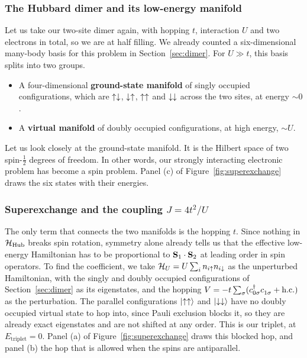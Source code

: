 \documentclass[lecture_notes.tex]{subfiles}
\begin{document}
\subsubsection{The Hubbard dimer and its low-energy manifold}
Let us take our two-site dimer again, with hopping $t$, interaction $U$ and two electrons in
total, so we are at half filling. We already counted a six-dimensional many-body basis for this
problem in Section~\ref{sec:dimer}. For $U \gg t$, this basis splits into two groups.
\begin{itemize}[nosep]
  \item A four-dimensional \textbf{ground-state manifold} of singly occupied configurations,
    which are $\uparrow\downarrow$, $\downarrow\uparrow$, $\uparrow\uparrow$ and $\downarrow\downarrow$ across the two sites, at energy $\sim 0$.
  \item A \textbf{virtual manifold} of doubly occupied configurations, at high energy, $\sim U$.
\end{itemize}
Let us look closely at the ground-state manifold. It is the Hilbert space of two
spin-$\tfrac12$ degrees of freedom. In other words, our strongly interacting electronic problem
has become a spin problem. Panel (c) of Figure~\ref{fig:superexchange} draws the six states with
their energies.

\subsubsection{Superexchange and the coupling $J = 4t^2/U$}
The only term that connects the two manifolds is the hopping $t$. Since nothing in
$\mathcal{H}_{\mathrm{Hub}}$ breaks spin rotation, symmetry alone already tells us that the effective
low-energy Hamiltonian has to be proportional to $\vb S_1\cdot\vb S_2$ at leading order in spin
operators. To find the coefficient, we take $\mathcal{H}_U = U\sum_i n_{i\uparrow}n_{i\downarrow}$ as
the unperturbed Hamiltonian, with the singly and doubly occupied configurations of
Section~\ref{sec:dimer} as its eigenstates, and the hopping $V =
-t\sum_\sigma(\cre{0\sigma}\ann{1\sigma}+\mathrm{h.c.})$ as the perturbation. The parallel
configurations $\ket{\uparrow\uparrow}$ and $\ket{\downarrow\downarrow}$ have no doubly occupied virtual state to hop
into, since Pauli exclusion blocks it, so they are already exact eigenstates and are not shifted
at any order. This is our triplet, at $E_{\mathrm{triplet}}=0$. Panel (a) of
Figure~\ref{fig:superexchange} draws this blocked hop, and panel (b) the hop that is allowed when
the spins are antiparallel.
\end{document}
